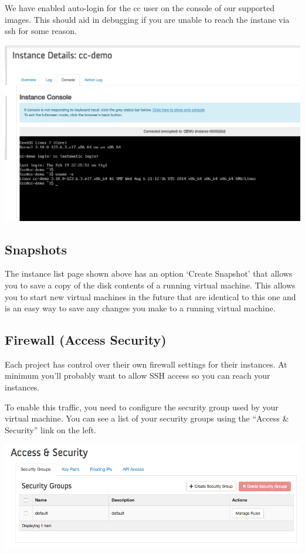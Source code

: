 We have enabled auto-login for the cc user on the console of our
supported images. This should aid in debugging if you are unable to
reach the instane via ssh for some reason.

\includegraphics[width=0.8\columnwidth]{images/chameleon/openstack_alamo_console.png}

\subsection{Snapshots}\label{snapshots}

The instance list page shown above has an option `Create Snapshot' that
allows you to save a copy of the disk contents of a running virtual
machine. This allows you to start new virtual machines in the future
that are identical to this one and is an easy way to save any changes
you make to a running virtual machine.

\subsection{Firewall (Access Security)}\label{firewall-access-security}

Each project has control over their own firewall settings for their
instances. At minimum you'll probably want to allow SSH access so you
can reach your instances.

To enable this traffic, you need to configure the security group used by
your virtual machine. You can see a list of your security groups using
the ``Access \& Security'' link on the left.

\includegraphics[width=0.8\columnwidth]{images/chameleon/openstack_alamo_security_groups.png}

